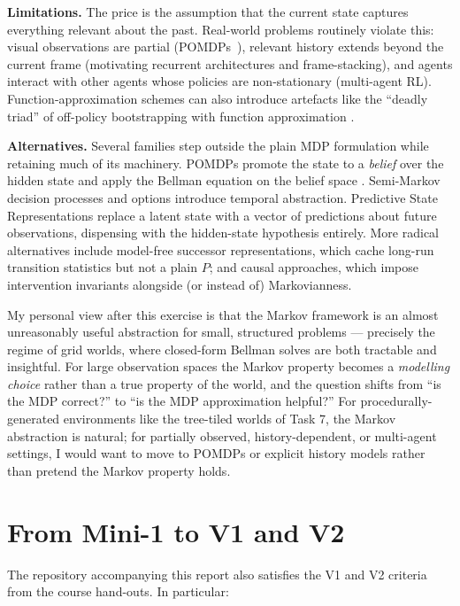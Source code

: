 \documentclass[11pt]{article}
\begin{document}
\textbf{Limitations.} The price is the assumption that the current
state captures everything relevant about the past. Real-world problems
routinely violate this: visual observations are partial
(POMDPs~\citep{kaelbling1998}), relevant history extends beyond the
current frame (motivating recurrent architectures and frame-stacking),
and agents interact with other agents whose policies are
non-stationary (multi-agent RL). Function-approximation schemes can
also introduce artefacts like the ``deadly triad'' of off-policy
bootstrapping with function approximation \citep{thrun1993}.

\textbf{Alternatives.} Several families step outside the plain MDP
formulation while retaining much of its machinery. POMDPs promote the
state to a \emph{belief} over the hidden state and apply the Bellman
equation on the belief space \citep{kaelbling1998}. Semi-Markov
decision processes and options introduce temporal abstraction.
Predictive State Representations replace a latent state with a vector
of predictions about future observations, dispensing with the
hidden-state hypothesis entirely. More radical alternatives include
model-free successor representations, which cache long-run transition
statistics but not a plain $P$; and causal approaches, which impose
intervention invariants alongside (or instead of) Markovianness.

My personal view after this exercise is that the Markov framework is
an almost unreasonably useful abstraction for small, structured
problems --- precisely the regime of grid worlds, where closed-form
Bellman solves are both tractable and insightful. For large
observation spaces the Markov property becomes a \emph{modelling
choice} rather than a true property of the world, and the question
shifts from ``is the MDP correct?'' to ``is the MDP approximation
helpful?'' For procedurally-generated environments like the tree-tiled
worlds of Task 7, the Markov abstraction is natural; for partially
observed, history-dependent, or multi-agent settings, I would want to
move to POMDPs or explicit history models rather than pretend the
Markov property holds.

\section{From Mini-1 to V1 and V2}

The repository accompanying this report also satisfies the V1 and V2
criteria from the course hand-outs. In particular:
\end{document}
